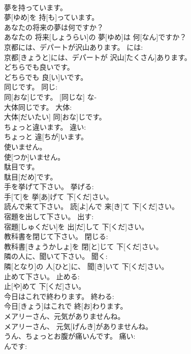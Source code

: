 \documentclass[8pt]{extreport}
\begin{document}
\begin{CJK}{UTF8}{min}
\\	夢を持っています。	
\\	夢[ゆめ]を 持[も]っています。	
\\	あなたの将来の夢は何ですか？	
\\	あなたの 将来[しょうらい]の 夢[ゆめ]は 何[なん]ですか？	
\\	京都には、デパートが沢山あります。	には: 
\\	京都[きょうと]には、デパートが 沢山[たくさん]あります。	
\\	どちらでも良いです。	
\\	どちらでも 良[い]いです。		
\\	同じです。	同じ: 
\\	同[おな]じです。	[同じな] な-
\\	大体同じです。	大体: 
\\	大体[だいたい] 同[おな]じです。	
\\	ちょっと違います。	違い: 
\\	ちょっと 違[ちが]います。	
\\	使いません。	
\\	使[つか]いません。		
\\	駄目です。	
\\	駄目[だめ]です。		
\\	手を挙げて下さい。	挙げる: 
\\	手[て]を 挙[あ]げて 下[くだ]さい。	
\\	読んで来て下さい。		読[よ]んで 来[き]て 下[くだ]さい。		
\\	宿題を出して下さい。	出す: 
\\	宿題[しゅくだい]を 出[だ]して 下[くだ]さい。		
\\	教科書を閉じて下さい。	閉じる: 
\\	教科書[きょうかしょ]を 閉[と]じて 下[くだ]さい。		
\\	隣の人に、聞いて下さい。	聞く: 
\\	隣[となり]の 人[ひと]に、 聞[き]いて 下[くだ]さい。		
\\	止めて下さい。	止める: 
\\	止[や]めて 下[くだ]さい。		
\\	今日はこれで終わります。	終わる: 
\\	今日[きょう]はこれで 終[お]わります。		
\\	メアリーさん、元気がありませんね。	
\\	メアリーさん、 元気[げんき]がありませんね。	
\\	うん、ちょっとお腹が痛いんです。	痛い: 
\\	んです: 

\end{CJK}
\end{document}
